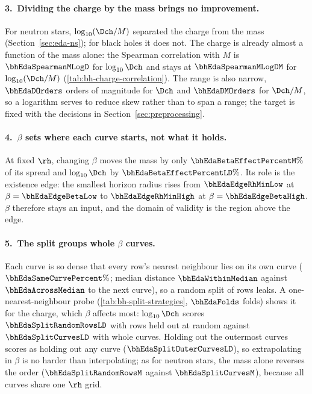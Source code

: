\FloatBarrier

\paragraph{3.\ Dividing the charge by the mass brings no improvement.}
For neutron stars, $\log_{10}(\Dch/M)$ separated the charge from the mass (Section~\ref{sec:eda-ns}); for black holes it does not. The charge is already almost a function of the mass alone: the Spearman correlation with $M$ is $\bhEdaSpearmanMLogD$ for $\log_{10}\Dch$ and stays at $\bhEdaSpearmanMLogDM$ for $\log_{10}(\Dch/M)$ (\cref{tab:bh-charge-correlation}). The range is also narrow, $\bhEdaDOrders$ orders of magnitude for $\Dch$ and $\bhEdaDMOrders$ for $\Dch/M$, so a logarithm serves to reduce skew rather than to span a range; the target is fixed with the decisions in Section~\ref{sec:preprocessing}.

\FloatBarrier

\paragraph{4.\ $\beta$ sets where each curve starts, not what it holds.}
At fixed $\rh$, changing $\beta$ moves the mass by only $\bhEdaBetaEffectPercentM\%$ of its spread and $\log_{10}\Dch$ by $\bhEdaBetaEffectPercentLD\%$. Its role is the existence edge: the smallest horizon radius rises from $\bhEdaEdgeRhMinLow$ at $\beta = \bhEdaEdgeBetaLow$ to $\bhEdaEdgeRhMinHigh$ at $\beta = \bhEdaEdgeBetaHigh$. $\beta$ therefore stays an input, and the domain of validity is the region above the edge.

\FloatBarrier

\paragraph{5.\ The split groups whole $\beta$ curves.}
Each curve is so dense that every row's nearest neighbour lies on its own curve ($\bhEdaSameCurvePercent\%$; median distance $\bhEdaWithinMedian$ against $\bhEdaAcrossMedian$ to the next curve), so a random split of rows leaks. A one-nearest-neighbour probe (\cref{tab:bh-split-strategies}, $\bhEdaFolds$ folds) shows it for the charge, which $\beta$ affects most: $\log_{10}\Dch$ scores $\bhEdaSplitRandomRowsLD$ with rows held out at random against $\bhEdaSplitCurvesLD$ with whole curves. Holding out the outermost curves scores as holding out any curve ($\bhEdaSplitOuterCurvesLD$), so extrapolating in $\beta$ is no harder than interpolating; as for neutron stars, the mass alone reverses the order ($\bhEdaSplitRandomRowsM$ against $\bhEdaSplitCurvesM$), because all curves share one $\rh$ grid.

